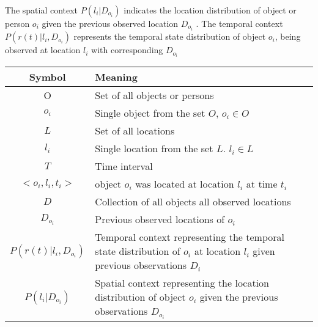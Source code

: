      The spatial context $P(l_i | D_{o_i})$ indicates the location distribution of object or person $o_i$ given the previous observed location $D_{o_i}$ . The temporal context $P(r(t) | l_i, D_{o_i})$ represents the temporal state distribution of object $o_i$, being observed at location $l_i$ with corresponding $D_{o_i}$
    


\begin{tabular}{cp{8cm}}
    \hline
	Symbol & Meaning\\
	\hline
	O & Set of all objects or persons\\
	$o_i$ & Single object from the set $O$, $o_i \in O$ \\
	$L$ & Set of all locations\\
	$l_i$ & Single location from the set $L$. $l_i\in L$\\
    $T$ & Time interval\\
    \hline
	$<o_i,l_i,t_i>$ & object $o_i$ was located at location $l_i$ at time $t_i$\\
	$D$ & Collection of all objects all observed locations\\
	$D_{o_i}$ & Previous observed locations of $o_i$\\ 
    \hline
     $P(r(t) | l_i, D_{o_i})$ &  Temporal context representing the temporal state distribution of $o_i$ at location $l_i$ given previous observations $D_i$\\
     $P(l_i | D_{o_i})$ & Spatial context representing the location distribution of object $o_i$ given the previous observations $D_{o_i}$\\
    \hline
\end{tabular}

